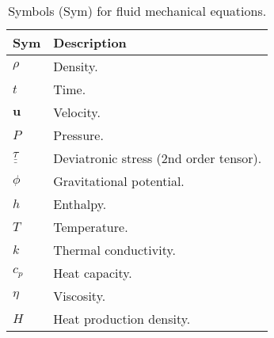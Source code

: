 \begin{table}[h!]
    \centering
    \begin{tabular}{ll}
    \hline \hline
    \textbf{Sym} & \textbf{Description} \\
    \hline
        $\rho$ & Density. \\
        $t$ & Time. \\
        $\mathbf{u}$ & Velocity. \\
        $P$ & Pressure. \\
        $\underline{\underline{\tau}}$ & Deviatronic stress (2nd order tensor). \\
        $\phi$ & Gravitational potential. \\
         $h$ & Enthalpy. \\
         $T$ & Temperature. \\
         $k$ & Thermal conductivity. \\
         $c_p$ & Heat capacity.\\
         $\eta$ & Viscosity. \\
         $H$ & Heat production density. \\
    \hline \hline
    \end{tabular}
    \caption{Symbols (Sym) for fluid mechanical equations.}
    \label{tab:fluid_variables}
\end{table}
